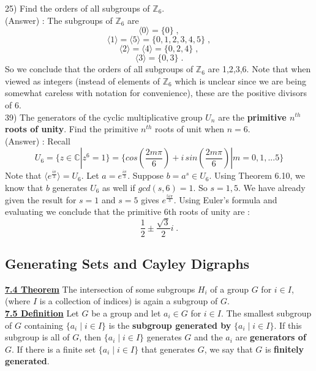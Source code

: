 \documentclass[12pt, letterpaper]{article}
\begin{document}
25) Find the orders of all subgroups of $\mathbb{Z}_6$. \\

(Answer) : The subgroups of $\mathbb{Z}_6$ are
$$\langle 0 \rangle = \{0\}\;,$$
$$\langle 1 \rangle = \langle 5 \rangle = \{0,1,2,3,4,5\} \;,$$
$$\langle 2 \rangle = \langle 4 \rangle = \{0,2,4\}\;,$$
$$\langle 3 \rangle = \{0,3\} \;.$$
So we conclude that the orders of all subgroups of $\mathbb{Z}_6$ are 1,2,3,6. Note that when viewed as integers (instead of elements of $\mathbb{Z}_6$ which is unclear since we are being somewhat careless with notation for convenience), these are the positive divisors of 6. \\

39) The generators of the cyclic multiplicative group $U_n$ are the {\bf primitive $n^{th}$ roots of unity}. Find the primitive $n^{th}$ roots of unit when $n = 6$. \\

(Answer) : Recall $$U_6 = \{z \in \mathbb{C} | z^6 = 1\} = \{cos \left(\frac{2m\pi}{6} \right) + i\, sin \left(\frac{2m\pi}{6} \right) | m= 0,1,...5 \}$$
Note that $\langle e^{\frac{i\pi}{3}}\rangle = U_6$. Let $a = e^{\frac{i\pi}{3}}$. Suppose $b = a^s \in U_6$. Using Theorem 6.10, we know that $b$ generates $U_6$ as well if $gcd(s,6) = 1$. So $s = 1,5$. We have already given the result for $s = 1$ and $s = 5$ gives $e^{\frac{5 i \pi}{3}}$. Using Euler's formula and evaluating we conclude that the primitive 6th roots of unity are : $$\frac{1}{2} \pm \frac{\sqrt{3}}{2} i \;.$$

\subsection{Generating Sets and Cayley Digraphs}

\noindent \underline{\bf 7.4 Theorem} The intersection of some subgroups $H_i$ of a group $G$ for $i \in I$, (where $I$ is a collection of indices) is again a subgroup of $G$. \\

\noindent \underline{\bf 7.5 Definition} Let $G$ be a group and let $a_i \in G$ for $i \in I$. The smallest subgroup of $G$ containing $\{a_i \; | \; i \in I\}$ is the {\bf subgroup generated by} $\{a_i \; | \; i \in I \}$. If this subgroup is all of $G$, then $\{a_i \; | \; i \in I \}$ generates $G$ and the $a_i$ are {\bf generators of} $G$. If there is a finite set $\{a_i \; | \; i \in I \}$ that generates $G$, we say that $G$ is {\bf finitely generated}. \\
\end{document}

